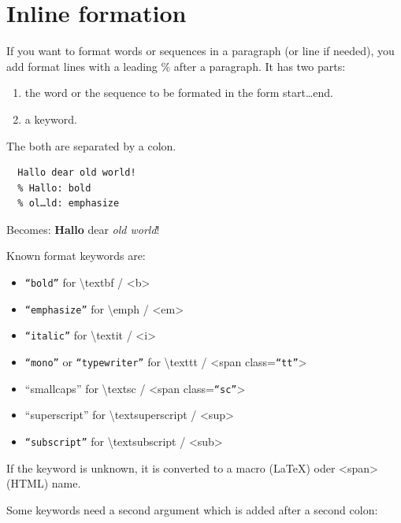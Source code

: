 \documentclass{article}
\begin{document}
\section{Inline formation}

{If you want to format words or sequences in a paragraph (or
line if needed), you add format lines with a leading \% after
a paragraph. It has two parts:\\}

\begin{enumerate}
\item the word or the sequence to be formated in the form
  start…end. 
\item a keyword.
\end{enumerate}


{The both are separated by a colon.\\}

\begin{verbatim}
  Hallo dear old world!
  % Hallo: bold
  % ol…ld: emphasize
\end{verbatim}


{Becomes:
\textbf{Hallo} dear \emph{old world}!\\}

{Known format keywords are:\\}

\begin{itemize}
\item \texttt{“bold”} for \textbackslash textbf / <b>
\item \texttt{“emphasize”} for \textbackslash emph / <em>
\item \texttt{“italic”} for \textbackslash textit / <i>
\item \texttt{“mono”} or \texttt{“typewriter”} for \textbackslash texttt / <span class=\texttt{“tt”}>
\item “smallcaps” for \textbackslash textsc / <span class=\texttt{“sc”}>
\item “superscript” for \textbackslash textsuperscript / <sup>
\item \texttt{“subscript”} for \textbackslash textsubscript / <sub>
\end{itemize}


{If the keyword is unknown, it is converted to a macro
(LaTeX) oder <span> (HTML) name.\\}

{Some keywords need a second argument which is added
after a second colon:\\}
\end{document}

